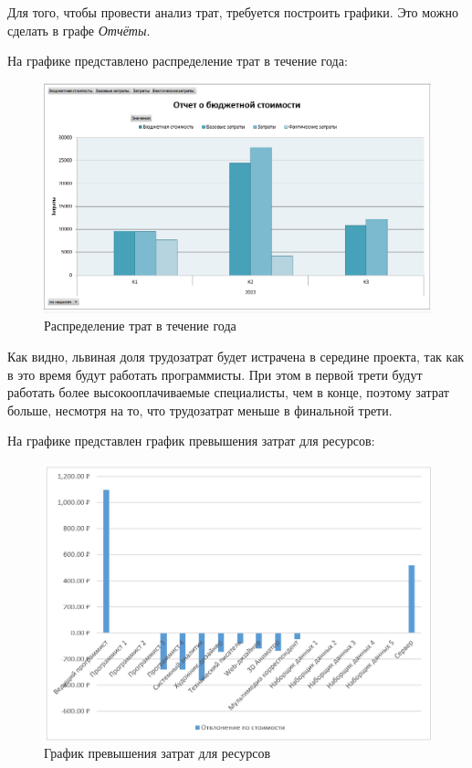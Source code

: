 Для того, чтобы провести анализ трат, требуется построить графики.
Это можно сделать в графе \textit{Отчёты}.

На графике представлено распределение трат в течение года:
\FloatBarrier
\begin{figure}[h]	
	\begin{center}
		\includegraphics[width=\linewidth]{inc/budjet.png}
	\end{center}
	\captionsetup{justification=centering}
	\caption{Распределение трат в течение года}
\end{figure}
\FloatBarrier 

Как видно, львиная доля трудозатрат будет истрачена в середине проекта, так как в это время будут работать программисты.
При этом в первой трети будут работать более высокооплачиваемые специалисты, чем в конце, поэтому затрат больше, несмотря на то, что трудозатрат меньше в финальной трети.

\newpage
На графике представлен график превышения затрат для ресурсов:
\FloatBarrier
\begin{figure}[h]	
	\begin{center}
		\includegraphics[width=\linewidth]{inc/graphResourses.png}
	\end{center}
	\captionsetup{justification=centering}
	\caption{График превышения затрат для ресурсов}
\end{figure}
\FloatBarrier 

